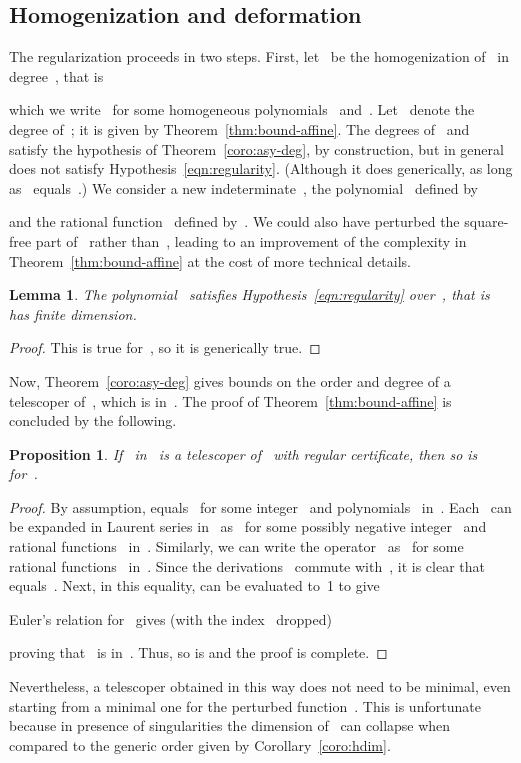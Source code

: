 \documentclass{sig-alternate}
\newtheorem{prop}[thm]{Proposition}
\newtheorem{lem}[thm]{Lemma}
\begin{document}
\subsection{Homogenization and deformation}

\noindent The regularization proceeds in two steps.
First, let~ be the homogenization of~ in degree~, that is

which we write~ for some homogeneous polynomials~ and~. Let~ denote the degree of~;
it is given by Theorem~\ref{thm:bound-affine}.
The degrees of~ and  satisfy the hypothesis of Theorem~\ref{coro:asy-deg}, by construction, but in general~ does not satisfy Hypothesis~\eqref{eqn:regularity}.
(Although it does generically, as long as~ equals~.)
We consider a new indeterminate~, the polynomial~ defined by

and the rational function~ defined by~.
We could also have perturbed the square-free part of~ rather than~, leading to an improvement of the complexity in Theorem~\ref{thm:bound-affine} at the cost of more technical details.

\begin{lem}
The polynomial~ satisfies Hypothesis~\eqref{eqn:regularity} over~, that is~ has finite dimension.
\end{lem}
\begin{proof}
This is true for~, so it is generically true. 
\end{proof}
Now, Theorem~\ref{coro:asy-deg} gives bounds on the order and degree of a telescoper of~, which is in~. The proof of Theorem~\ref{thm:bound-affine} is concluded by the following.
\begin{prop}\label{prop:telesc-regtosing}
  If~ in~ is a telescoper of~ with regular certificate, then so is~ for~.
\end{prop}
\begin{proof}
By assumption,  equals~ for some integer~ and polynomials~ in~.
Each~ can be expanded in Laurent series in~ as~ for some possibly negative integer~ and rational functions~ in~.
Similarly, we can write the operator~ as~ for some rational functions~ in~.
Since the derivations~ commute with~, it is clear that~ equals~.
Next, in this equality,  can be evaluated to~1 to give

Euler's relation for~ gives (with the index~ dropped)

proving that~ is in~. Thus, so is  and the proof is complete.
\end{proof}
Nevertheless, a telescoper obtained in this way does not need to be minimal, even starting from a minimal one for the perturbed function~.
This is unfortunate because in presence of singularities the dimension of~ can collapse when compared to the generic order given by Corollary~\ref{coro:hdim}. 
\end{document}
